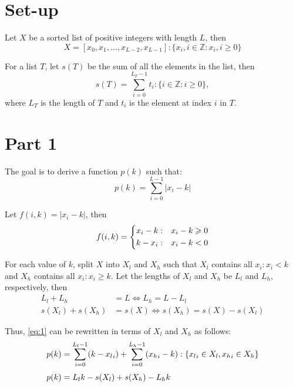\documentclass[11pt]{article}
\begin{document}
\section*{Set-up}

Let \(X\) be a sorted list of positive integers with length \(L\), then
\begin{equation*}
    X = {
    [x_0, x_1, \ldots, x_{L - 2}, x_{L - 1}]:
    \{x_i, i \in \mathbb{Z}: x_i, i \geqslant 0\}
    }
\end{equation*}

For a list \(T\), let \(s(T)\) be the sum of all the elements in the list, then
\begin{equation*}
    s(T) = \sum_{i = 0}^{L_T - 1} t_i: \{i \in \mathbb{Z}: i \geqslant 0\} {,}
\end{equation*}
where \(L_T\) is the length of \(T\) and \(t_i\) is the element at index \(i\)
in \(T\).

\section*{Part 1}
The goal is to derive a function \(p(k)\) such that:
\begin{equation}
    p(k) = \sum_{i = 0}^{L - 1} |x_i - k| \label{eq:1}
\end{equation}

Let \(f(i, k) = |x_i - k|\), then
\begin{equation*}
    f(i, k) =
    \begin{dcases}
        x_i - k: & x_i - k \geqslant 0 \\
        k - x_i: & x_i -k < 0
    \end{dcases}
\end{equation*}

\vspace{0.5\baselineskip}

For each value of \(k\), split \(X\) into \(X_l\) and \(X_h\) such that \(X_l\)
contains all \(x_i: x_i < k\) and \(X_h\) contains all \(x_i: x_i \geqslant
k\). Let the lengths of \(X_l\) and \(X_h\) be \(L_l\) and \(L_h\),
respectively, then
\begin{align}
    L_l + L_h       & = L \iff L_h = L - L_l \label{eq:2}             \\
    s(X_l) + s(X_h) & = s(X) \iff s(X_h) = s(X) - s(X_l) \label{eq:3}
\end{align}

Thus, \eqref{eq:1} can be rewritten in terms of \(X_l\) and \(X_h\) as follows:
\begin{equation*}
    \setlength{\jot}{0.5\baselineskip}
    \begin{aligned}
        p(k) & = {
        \sum_{i = 0}^{L_l - 1} (k - {x_{l}}_{i}) +
        \sum_{i = 0}^{L_h - 1} ({x_{h}}_{i} - k):
        \{{x_{l}}_{i} \in X_l, {x_{h}}_{i} \in X_h\}
        }                                        \\
        p(k) & = L_l k - s(X_l) + s(X_h) - L_h k
    \end{aligned}
\end{equation*}
\end{document}
